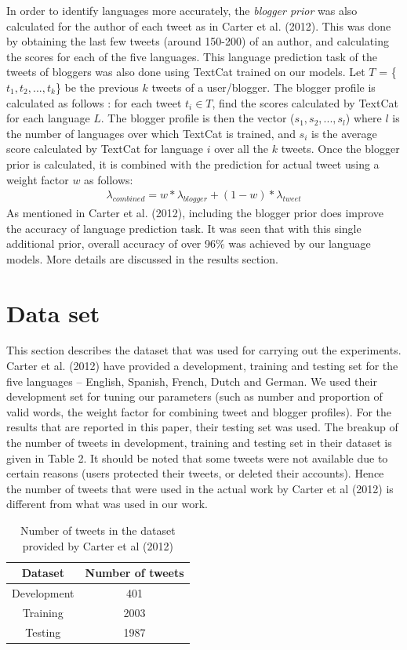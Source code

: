 \documentclass[11pt]{article}
\begin{document}
In order to identify languages more accurately, the {\em blogger prior} was also calculated for the author of each tweet as in Carter et al. (2012). This was done by obtaining the last few tweets (around 150-200) of an author, and calculating the scores for each of the five languages. This language prediction task of the tweets of bloggers was also done using TextCat trained on our models. Let $T$ = \{ $t_1, t_2, ..., t_k$\} be the previous $k$ tweets of a user/blogger. The blogger profile is calculated as follows : for each tweet $t_i \in T$, find the scores calculated by TextCat for each language $L$. The blogger profile is then the vector ($s_1, s_2, ..., s_l$) where $l$ is the number of languages over which TextCat is trained, and $s_i$ is the average score calculated by TextCat for language $i$ over all the $k$ tweets.
Once the blogger prior is calculated, it is combined with the prediction for actual tweet using a weight factor $w$ as follows: \\
\begin{eqnarray}
{\lambda}_{combined} = w * {\lambda}_{blogger} + (1 - w) * {\lambda}_{tweet} 
\end{eqnarray}
As mentioned in Carter et al. (2012), including the blogger prior does improve the accuracy of language prediction task. It was seen that with this single additional prior, overall accuracy of over 96\% was achieved by our language models. More details are discussed in the results section.

\section{Data set}
This section describes the dataset that was used for carrying out the experiments. Carter et al. (2012) have provided a development, training and testing set for the five languages -- English, Spanish, French, Dutch and German. We used their development set for tuning our parameters (such as number and proportion of valid words, the weight factor for combining tweet and blogger profiles). For the results that are reported in this paper, their testing set was used. The breakup of the number of tweets in development, training and testing set in their dataset is given in Table 2. It should be noted that some tweets were not available due to certain reasons (users protected their tweets, or deleted their accounts). Hence the number of tweets that were used in the actual work by Carter et al (2012) is different from what was used in our work.

\begin{table}
\begin{center}
\small
\begin{tabular}{|c|c|}
\hline
\textbf{Dataset} & \textbf{Number of tweets} \\
\hline
Development & 401 \\
Training & 2003 \\
Testing & 1987  \\ \hline
\end{tabular}
\caption{\footnotesize Number of tweets in the dataset provided by Carter et al (2012)}
\end{center}
\end{table}
\end{document}
